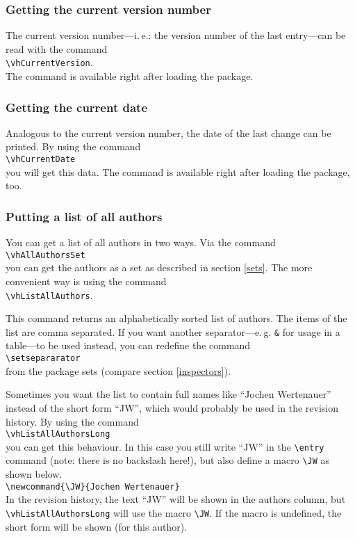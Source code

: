 \subsubsection{Getting the current version number}
The current version number---i.\,e.: the version number of the last entry---can be read with the command\\
\mbox{}\hspace{2em}\verb|\vhCurrentVersion|.\\
The command is available right after loading the package.

\subsubsection{Getting the current date}
Analogous to the current version number, the date of the last change can be printed. By using the command\\
\mbox{}\hspace{2em}\verb|\vhCurrentDate|\\
you will get this data. The command is available right after loading the package, too.

\subsubsection{Putting a list of all authors}
You can get a list of all authors in two ways. Via the command\\
\mbox{}\hspace{2em}\verb|\vhAllAuthorsSet|\\
you can get the authors as a set as described in section \ref{sets}. The more convenient way is using the command\\
\mbox{}\hspace{2em}\verb|\vhListAllAuthors|.

This command returns an alphabetically sorted list of authors. The items of the list are comma separated. If you want another separator---e.\,g. \texttt{\&} for usage in a table---to be used instead, you can redefine the command\\
\mbox{}\hspace{2em}\verb|\setsepararator|\\
from the package sets (compare section \ref{inspectors}).

Sometimes you want the list to contain full names like ``Jochen Wer\-ten\-au\-er'' instead of the short form ``JW'', which would probably be used in the revision history. By using the command\\
\mbox{}\hspace{2em}\verb|\vhListAllAuthorsLong|\\
you can get this behaviour. In this case you still write ``JW'' in the \verb|\entry| command (note: there is no backslash here!), but also define a macro \verb|\JW| as shown below.\\
\mbox{}\hspace{2em}\verb|\newcommand{\JW}{Jochen Wertenauer}|\\
In the revision history, the text ``JW'' will be shown in the authors column, but  \verb|\vhListAllAuthorsLong| will use the macro \verb|\JW|. If the macro is undefined, the short form will be shown (for this author).

